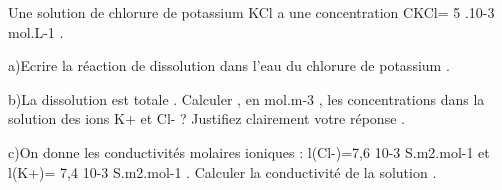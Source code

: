 Une solution de chlorure de potassium KCl a une concentration CKCl= 5 .10-3 mol.L-1 .

a)Ecrire la réaction de dissolution dans l'eau du chlorure de potassium .

b)La dissolution est totale . Calculer , en mol.m-3 , les concentrations dans la solution des ions K+ et Cl- ? Justifiez clairement votre réponse .

c)On donne les conductivités molaires ioniques : l(Cl-)=7,6 10-3 S.m2.mol-1 et l(K+)= 7,4 10-3 S.m2.mol-1 . Calculer la conductivité de la solution .
